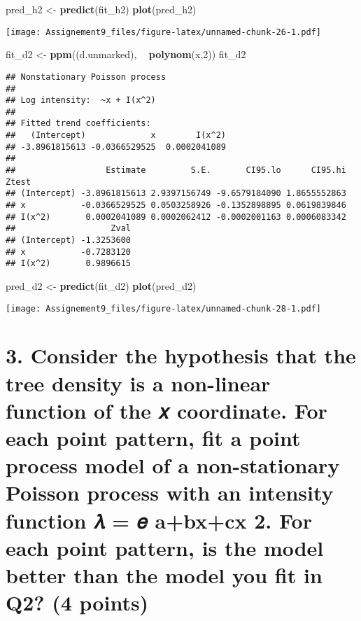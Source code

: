 \documentclass[]{article}
\newenvironment{Shaded}{\begin{snugshade}}{\end{snugshade}}
\newcommand{\DecValTok}[1]{\textcolor[rgb]{0.00,0.00,0.81}{#1}}
\newcommand{\KeywordTok}[1]{\textcolor[rgb]{0.13,0.29,0.53}{\textbf{#1}}}
\newcommand{\NormalTok}[1]{#1}
\newcommand{\OperatorTok}[1]{\textcolor[rgb]{0.81,0.36,0.00}{\textbf{#1}}}
\newcommand{\StringTok}[1]{\textcolor[rgb]{0.31,0.60,0.02}{#1}}
\begin{document}
\begin{Shaded}
\begin{Highlighting}[]
\NormalTok{pred_h2 <-}\StringTok{ }\KeywordTok{predict}\NormalTok{(fit_h2)}
\KeywordTok{plot}\NormalTok{(pred_h2)}
\end{Highlighting}
\end{Shaded}

\texttt{[image: Assignement9\_files/figure-latex/unnamed-chunk-26-1.pdf]}

\begin{Shaded}
\begin{Highlighting}[]
\NormalTok{fit_d2 <-}\StringTok{ }\KeywordTok{ppm}\NormalTok{((d.unmarked), }\OperatorTok{~}\StringTok{ }\KeywordTok{polynom}\NormalTok{(x,}\DecValTok{2}\NormalTok{))}
\NormalTok{fit_d2}
\end{Highlighting}
\end{Shaded}

\begin{verbatim}
## Nonstationary Poisson process
## 
## Log intensity:  ~x + I(x^2)
## 
## Fitted trend coefficients:
##   (Intercept)             x        I(x^2) 
## -3.8961815613 -0.0366529525  0.0002041089 
## 
##                  Estimate         S.E.       CI95.lo      CI95.hi Ztest
## (Intercept) -3.8961815613 2.9397156749 -9.6579184090 1.8655552863      
## x           -0.0366529525 0.0503258926 -0.1352898895 0.0619839846      
## I(x^2)       0.0002041089 0.0002062412 -0.0002001163 0.0006083342      
##                   Zval
## (Intercept) -1.3253600
## x           -0.7283120
## I(x^2)       0.9896615
\end{verbatim}

\begin{Shaded}
\begin{Highlighting}[]
\NormalTok{pred_d2 <-}\StringTok{ }\KeywordTok{predict}\NormalTok{(fit_d2)}
\KeywordTok{plot}\NormalTok{(pred_d2)}
\end{Highlighting}
\end{Shaded}

\texttt{[image: Assignement9\_files/figure-latex/unnamed-chunk-28-1.pdf]}

\hypertarget{consider-the-hypothesis-that-the-tree-density-is-a-non-linear-function-of-the-ux1d465-coordinate.-for-each-point-pattern-fit-a-point-process-model-of-a-non-stationary-poisson-process-with-an-intensity-function-ux1d706-ux1d452-abxcx-2.-for-each-point-pattern-is-the-model-better-than-the-model-you-fit-in-q2-4-points}{%
\section{3. Consider the hypothesis that the tree density is a
non-linear function of the 𝑥 coordinate. For each point pattern, fit a
point process model of a non-stationary Poisson process with an
intensity function 𝜆 = 𝑒 a+bx+cx 2. For each point pattern, is the model
better than the model you fit in Q2? (4
points)}\label{consider-the-hypothesis-that-the-tree-density-is-a-non-linear-function-of-the-ux1d465-coordinate.-for-each-point-pattern-fit-a-point-process-model-of-a-non-stationary-poisson-process-with-an-intensity-function-ux1d706-ux1d452-abxcx-2.-for-each-point-pattern-is-the-model-better-than-the-model-you-fit-in-q2-4-points}}
\end{document}
